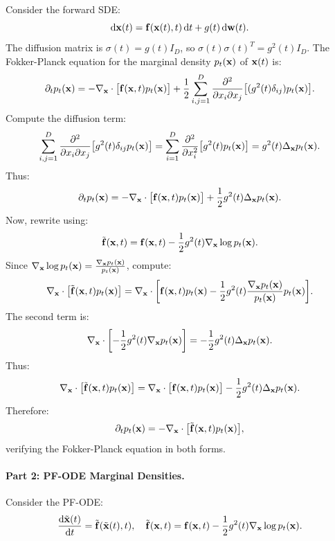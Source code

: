 Consider the forward SDE:
\[
\mathop{}\!\mathrm{d} {\mathbf{x}}(t) = {\mathbf{f}}({\mathbf{x}}(t), t)  \mathop{}\!\mathrm{d} t + g(t)  \mathop{}\!\mathrm{d} {\mathbf{w}}(t).
\]
The diffusion matrix is $\sigma(t) = g(t) I_D$, so $\sigma(t) \sigma(t)^T = g^2(t) I_D$. The Fokker-Planck equation for the marginal density $p_t({\mathbf{x}})$ of ${\mathbf{x}}(t)$ is:
\[
\partial_t p_t({\mathbf{x}}) = -\nabla_{{\mathbf{x}}} \cdot \bigl[ {\mathbf{f}}({\mathbf{x}}, t) p_t({\mathbf{x}}) \bigr] + \frac{1}{2} \sum_{i,j=1}^D \frac{\partial^2}{\partial x_i \partial x_j} \bigl[ (g^2(t) \delta_{ij}) p_t({\mathbf{x}}) \bigr].
\]
Compute the diffusion term:
\[
\sum_{i,j=1}^D \frac{\partial^2}{\partial x_i \partial x_j} \bigl[ g^2(t) \delta_{ij} p_t({\mathbf{x}}) \bigr] = \sum_{i=1}^D \frac{\partial^2}{\partial x_i^2} \bigl[ g^2(t) p_t({\mathbf{x}}) \bigr] = g^2(t) \Delta_{{\mathbf{x}}} p_t({\mathbf{x}}).
\]
Thus:
\[
\partial_t p_t({\mathbf{x}}) = -\nabla_{{\mathbf{x}}} \cdot \bigl[ {\mathbf{f}}({\mathbf{x}}, t) p_t({\mathbf{x}}) \bigr] + \frac{1}{2} g^2(t) \Delta_{{\mathbf{x}}} p_t({\mathbf{x}}).
\]
Now, rewrite using:
\[
\tilde {{\mathbf{f}}}({\mathbf{x}}, t) = {\mathbf{f}}({\mathbf{x}}, t) - \frac{1}{2} g^2(t) \nabla_{{\mathbf{x}}} \log p_t({\mathbf{x}}).
\]
Since $\nabla_{{\mathbf{x}}} \log p_t({\mathbf{x}}) = \frac{\nabla_{{\mathbf{x}}} p_t({\mathbf{x}})}{p_t({\mathbf{x}})}$, compute:
\[
\nabla_{{\mathbf{x}}} \cdot \bigl[ \tilde {{\mathbf{f}}}({\mathbf{x}}, t) p_t({\mathbf{x}}) \bigr] = \nabla_{{\mathbf{x}}} \cdot \biggl[ {\mathbf{f}}({\mathbf{x}}, t) p_t({\mathbf{x}}) - \frac{1}{2} g^2(t) \frac{\nabla_{{\mathbf{x}}} p_t({\mathbf{x}})}{p_t({\mathbf{x}})} p_t({\mathbf{x}}) \biggr].
\]
The second term is:
\[
\nabla_{{\mathbf{x}}} \cdot \biggl[ -\frac{1}{2} g^2(t) \nabla_{{\mathbf{x}}} p_t({\mathbf{x}}) \biggr] = -\frac{1}{2} g^2(t) \Delta_{{\mathbf{x}}} p_t({\mathbf{x}}).
\]
Thus:
\[
\nabla_{{\mathbf{x}}} \cdot \bigl[ \tilde {{\mathbf{f}}}({\mathbf{x}}, t) p_t({\mathbf{x}}) \bigr] = \nabla_{{\mathbf{x}}} \cdot \bigl[ {\mathbf{f}}({\mathbf{x}}, t) p_t({\mathbf{x}}) \bigr] - \frac{1}{2} g^2(t) \Delta_{{\mathbf{x}}} p_t({\mathbf{x}}).
\]
Therefore:
\[
\partial_t p_t({\mathbf{x}}) = -\nabla_{{\mathbf{x}}} \cdot \bigl[ \tilde {{\mathbf{f}}}({\mathbf{x}}, t) p_t({\mathbf{x}}) \bigr],
\]
verifying the Fokker-Planck equation in both forms.

\paragraph{Part 2: PF-ODE Marginal Densities.}

Consider the PF-ODE:
\[
\frac{\mathop{}\!\mathrm{d} \tilde{{\mathbf{x}}}(t)}{\mathop{}\!\mathrm{d} t} = \tilde {{\mathbf{f}}}(\tilde{{\mathbf{x}}}(t), t), \quad \tilde {{\mathbf{f}}}({\mathbf{x}}, t) = {\mathbf{f}}({\mathbf{x}}, t) - \frac{1}{2} g^2(t) \nabla_{{\mathbf{x}}} \log p_t({\mathbf{x}}).
\]

